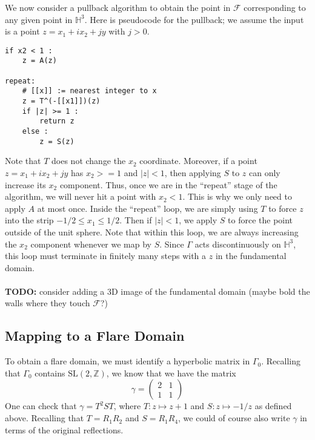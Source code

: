 \documentclass[]{article}
\begin{document}
We now consider a pullback algorithm to obtain the point in $\mathcal{F}$ corresponding to any given point in $\mathbb{H}^3$.
Here is pseudocode for the pullback; we assume the input is a point $z = x_1 + ix_2 + jy$ with $j > 0$.
\begin{verbatim}
if x2 < 1 :
    z = A(z)
    
repeat:
    # [[x]] := nearest integer to x
    z = T^(-[[x1]])(z)
    if |z| >= 1 :
        return z
    else :
        z = S(z)
\end{verbatim}
Note that $T$ does not change the $x_2$ coordinate.
Moreover, if a point $z = x_1 + ix_2 + jy$ has $x_2 >=1$ and $|z| < 1$, then applying $S$ to $z$ can only increase its $x_2$ component.
Thus, once we are in the ``repeat'' stage of the algorithm, we will never hit a point with $x_2 < 1$.
This is why we only need to apply $A$ at most once.
Inside the ``repeat'' loop, we are simply using $T$ to force $z$ into the strip $-1/2 \leq x_1 \leq 1/2$.
Then if $|z| < 1$, we apply $S$ to force the point outside of the unit sphere.
Note that within this loop, we are always increasing the $x_2$ component whenever we map by $S$.
Since $\Gamma$ acts discontinuously on $\mathbb{H}^3$, this loop must terminate in finitely many steps with a $z$ in the fundamental domain.
\\ \\
\textbf{TODO:} consider adding a 3D image of the fundamental domain (maybe bold the walls where they touch $\mathcal{F}$?)

\subsection*{Mapping to a Flare Domain}

To obtain a flare domain, we must identify a hyperbolic matrix in $\Gamma_0$.
Recalling that $\Gamma_0$ contains $\text{SL}(2, \mathbb{Z})$, we know that we have the matrix
$$
\gamma =
\begin{pmatrix}
	2 & 1 \\
	1 & 1
\end{pmatrix}
$$
One can check that $\gamma = T^2ST$, where $T: z \mapsto z + 1$ and $S: z \mapsto -1/z$ as defined above.
Recalling that $T = R_1R_2$ and $S = R_1R_4$, we could of course also write $\gamma$ in terms of the original reflections.
\end{document}
